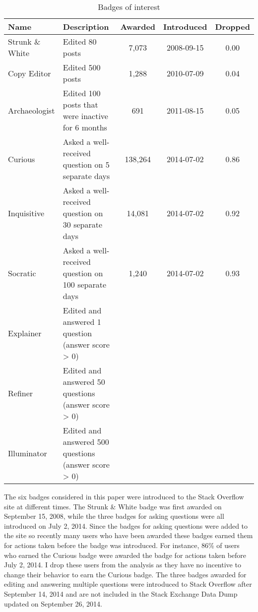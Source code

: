\begin{table}
  \centering
  \begin{threeparttable}
    \caption{Badges of interest}
    \label{tab:badges}
    \small
    \begin{tabular}{@{}llccc@{}}
      \toprule
      Name & Description & Awarded & Introduced & Dropped \\
      \midrule
      Strunk \& White & Edited 80 posts & 7,073 & 2008-09-15 & 0.00 \\
      Copy Editor & Edited 500 posts & 1,288 & 2010-07-09 & 0.04 \\
      Archaeologist & Edited 100 posts that were inactive for 6 months & 691 & 2011-08-15 & 0.05 \\
      \midrule
      Curious & Asked a well-received question on 5 separate days\footnotemark & 138,264 & 2014-07-02 & 0.86 \\
      Inquisitive & Asked a well-received question on 30 separate days & 14,081 & 2014-07-02 & 0.92 \\
      Socratic & Asked a well-received question on 100 separate days & 1,240 & 2014-07-02 & 0.93 \\
      \midrule
      Explainer & Edited and answered 1 question (answer score > 0) & & \\
      Refiner & Edited and answered 50 questions (answer score > 0) & & \\
      Illuminator & Edited and answered 500 questions (answer score > 0) & & \\
      \bottomrule
    \end{tabular}
    \begin{tablenotes}
    \item The six badges considered in this paper were introduced to the Stack Overflow site at different times. The Strunk \& White badge was first awarded on September 15, 2008, while the three badges for asking questions were all introduced on July 2, 2014. Since the badges for asking questions were added to the site so recently many users who have been awarded these badges earned them for actions taken before the badge was introduced. For instance, 86\% of users who earned the Curious badge were awarded the badge for actions taken before July 2, 2014. I drop these users from the analysis as they have no incentive to change their behavior to earn the Curious badge. The three badges awarded for editing and answering multiple questions were introduced to Stack Overflow after September 14, 2014 and are not included in the Stack Exchange Data Dump updated on September 26, 2014.
    \end{tablenotes}
  \end{threeparttable}
\end{table}
